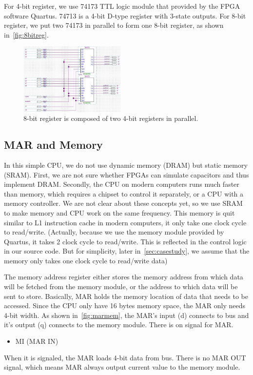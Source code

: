 For 4-bit register, we use 74173 TTL logic module that provided by the FPGA software Quartus. 74713 is a 4-bit D-type register with 3-state outputs. For 8-bit register, we put two 74173 in parallel to form one 8-bit register, as shown in~\autoref{fig:8bitreg}.

\begin{figure}[th]
	\includegraphics[width=0.47\textwidth]{figures/8bitreg}
	\centering
	\caption{8-bit register is composed of two 4-bit registers in parallel.}
	\label{fig:8bitreg}
\end{figure}


\subsection{MAR and Memory}

In this simple CPU, we do not use dynamic memory (DRAM) but static memory (SRAM). First, we are not sure whether FPGAs can simulate capacitors and thus implement DRAM. Secondly, the CPU on modern computers runs much faster than memory, which requires a chipset to control it separately, or a CPU with a memory controller. We are not clear about these concepts yet, so we use SRAM to make memory and CPU work on the same frequency. This memory is quit similar to L1 instruction cache in modern computers, it only take one clock cycle to read/write. (Actually, because we use the memory module provided by Quartus, it takes 2 clock cycle to read/write. This is reflected in the control logic in our source code. But for simplicity, later in~\autoref{sec:casestudy}, we assume that the memory only takes one clock cycle to read/write data)


The memory address register either stores the memory address from which data will be fetched from the memory module, or the address to which data will be sent to store. Basically, MAR holds the memory location of data that needs to be accessed. Since the CPU only have 16 bytes memory space, the MAR only needs 4-bit width. As shown in~\autoref{fig:marmem}, the MAR's input (d) connects to bus and it's output (q) connects to the memory module. There is on signal for MAR. 
\begin{itemize}
	\item MI (MAR IN)
\end{itemize}
When it is signaled, the MAR loads 4-bit data from bus. There is no MAR OUT signal, which means MAR always output current value to the memory module.


